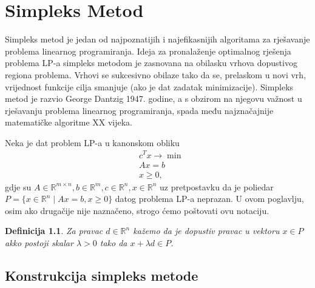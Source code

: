 \documentclass[a4paper, utf8, 11pt, colorlinks]{book}
\newtheorem{definition}{Definicija}[chapter]
\theoremstyle{definition}
\begin{document}
\newpage 
\chapter{Simpleks Metod}

Simpleks metod je jedan od najpoznatijih i najefikasnijih algoritama za rješavanje problema linearnog programiranja. Ideja za pronalaženje optimalnog rješenja problema LP-a simpleks metodom je zasnovana na  obilasku vrhova dopustivog regiona problema. Vrhovi se sukcesivno obilaze tako da se, prelaskom u novi vrh, vrijednost funkcije cilja smanjuje (ako je dat zadatak minimizacije). Simpleks metod je razvio George Dantzig 1947. godine, a s obzirom na njegovu važnost u rješavanju problema linearnog programiranja, spada među najznačajnije matematičke algoritme XX vijeka.

Neka je dat problem LP-a u kanonskom obliku
\begin{align}
    &c^Tx \rightarrow \min \nonumber \\ 
    & A x = b \nonumber \\
    & x \geq 0, \label{eq:lp_equality_constraint}
\end{align}
gdje su $A \in \mathbb{R}^{m \times n}, b \in \mathbb{R}^m, c \in \mathbb{R}^n, x\in \mathbb{R}^n$ uz pretpostavku da je poliedar $P=\{ x \in \mathbb{R}^n \mid A x = b , x \geq 0 \}$ datog problema LP-a neprazan.  U ovom poglavlju, osim ako drugačije nije naznačeno, strogo ćemo poštovati ovu notaciju. 


\begin{definition}
      Za pravac $d\in \mathbb{R}^n$ kažemo da je dopustiv pravac u vektoru $x \in P$ akko postoji skalar $\lambda > 0$ tako da $x + \lambda d \in P$.
\end{definition}

\section{Konstrukcija simpleks metode}
\end{document}
